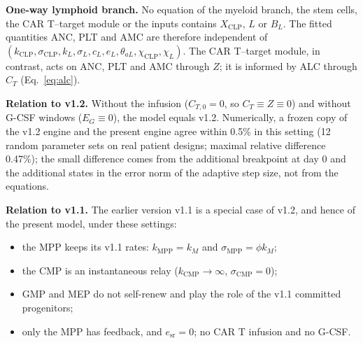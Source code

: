 \documentclass[11pt]{article}
\newcommand{\X}[1]{X_{\mathrm{#1}}}
\begin{document}
\textbf{One-way lymphoid branch.} No equation of the myeloid branch, the stem cells, the CAR T--target module or the inputs contains $\X{CLP}$, $L$ or $B_L$. The fitted quantities ANC, PLT and AMC are therefore independent of $(k_{\mathrm{CLP}},\sigma_{\mathrm{CLP}},k_L,\sigma_L,c_L,e_L,\theta_{aL},\chi_{\mathrm{CLP}},\chi_L)$. The CAR T--target module, in contrast, acts on ANC, PLT and AMC through $Z$; it is informed by ALC through $C_T$ (Eq.~\ref{eq:alc}).

\textbf{Relation to v1.2.} Without the infusion ($C_{T,0}=0$, so $C_T\equiv Z\equiv0$) and without G-CSF windows ($E_G\equiv0$), the model equals v1.2. Numerically, a frozen copy of the v1.2 engine and the present engine agree within 0.5\% in this setting (12 random parameter sets on real patient designs; maximal relative difference 0.47\%); the small difference comes from the additional breakpoint at day 0 and the additional states in the error norm of the adaptive step size, not from the equations.

\textbf{Relation to v1.1.} The earlier version v1.1 is a special case of v1.2, and hence of the present model, under these settings:
\begin{itemize}
\item the MPP keeps its v1.1 rates: $k_{\mathrm{MPP}}=k_M$ and $\sigma_{\mathrm{MPP}}=\phi k_M$;
\item the CMP is an instantaneous relay ($k_{\mathrm{CMP}}\to\infty$, $\sigma_{\mathrm{CMP}}=0$);
\item GMP and MEP do not self-renew and play the role of the v1.1 committed progenitors;
\item only the MPP has feedback, and $e_{\mathrm{sr}}=0$; no CAR T infusion and no G-CSF.
\end{itemize}
\end{document}
